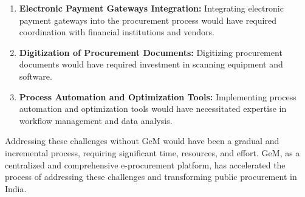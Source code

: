 \begin{enumerate}
    \item \textbf{Electronic Payment Gateways Integration:} Integrating electronic payment gateways into the procurement process would have required coordination with financial institutions and vendors.
    
    \item \textbf{Digitization of Procurement Documents:} Digitizing procurement documents would have required investment in scanning equipment and software.
    
    \item \textbf{Process Automation and Optimization Tools:} Implementing process automation and optimization tools would have necessitated expertise in workflow management and data analysis.
\end{enumerate}

Addressing these challenges without GeM would have been a gradual and incremental process, requiring significant time, resources, and effort. GeM, as a centralized and comprehensive e-procurement platform, has accelerated the process of addressing these challenges and transforming public procurement in India.

